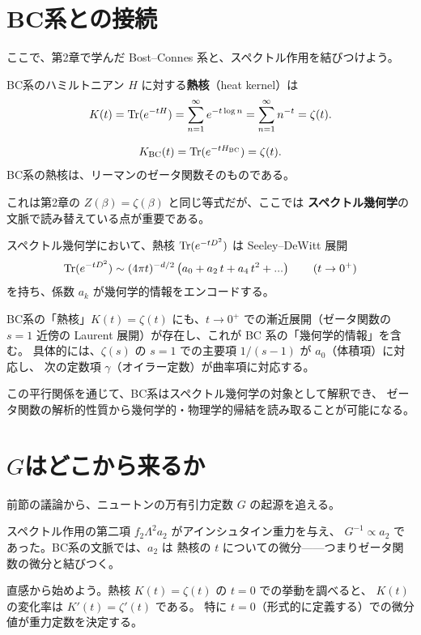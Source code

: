 \section{BC系との接続}
\label{sec:3.4}

ここで、第2章で学んだ Bost--Connes 系と、スペクトル作用を結びつけよう。

BC系のハミルトニアン $H$ に対する\textbf{熱核}（heat kernel）は
\[
  K(t) = \operatorname{Tr}(e^{-tH}) = \sum_{n=1}^{\infty} e^{-t\log n}
       = \sum_{n=1}^{\infty} n^{-t} = \zeta(t).
\]

\begin{keybox}[BC系の熱核 $=$ ゼータ関数]
\[
  K_{\mathrm{BC}}(t) = \operatorname{Tr}(e^{-tH_{\mathrm{BC}}}) = \zeta(t).
\]
BC系の熱核は、リーマンのゼータ関数そのものである。
\end{keybox}

これは第2章の $Z(\beta) = \zeta(\beta)$ と同じ等式だが、ここでは
\textbf{スペクトル幾何学}の文脈で読み替えている点が重要である。

スペクトル幾何学において、熱核 $\operatorname{Tr}(e^{-tD^2})$ は Seeley--DeWitt 展開
\[
  \operatorname{Tr}(e^{-tD^2}) \sim (4\pi t)^{-d/2}\left(a_0 + a_2\, t + a_4\, t^2 + ...\right)
  \qquad (t\to 0^+)
\]
を持ち、係数 $a_k$ が幾何学的情報をエンコードする。

BC系の「熱核」$K(t) = \zeta(t)$ にも、$t\to 0^+$ での漸近展開（ゼータ関数の
$s=1$ 近傍の Laurent 展開）が存在し、これが BC 系の「幾何学的情報」を含む。
具体的には、$\zeta(s)$ の $s=1$ での主要項 $1/(s-1)$ が $a_0$（体積項）に対応し、
次の定数項 $\gamma$（オイラー定数）が曲率項に対応する。

この平行関係を通じて、BC系はスペクトル幾何学の対象として解釈でき、
ゼータ関数の解析的性質から幾何学的・物理学的帰結を読み取ることが可能になる。

\section{$G$はどこから来るか}
\label{sec:3.5}

前節の議論から、ニュートンの万有引力定数 $G$ の起源を追える。

スペクトル作用の第二項 $f_2\Lambda^2 a_2$ がアインシュタイン重力を与え、
$G^{-1} \propto a_2$ であった。BC系の文脈では、$a_2$ は
熱核の $t$ についての微分——つまりゼータ関数の微分と結びつく。

直感から始めよう。熱核 $K(t) = \zeta(t)$ の $t = 0$ での挙動を調べると、
$K(t)$ の変化率は $K'(t) = \zeta'(t)$ である。
特に $t = 0$（形式的に定義する）での微分値が重力定数を決定する。


